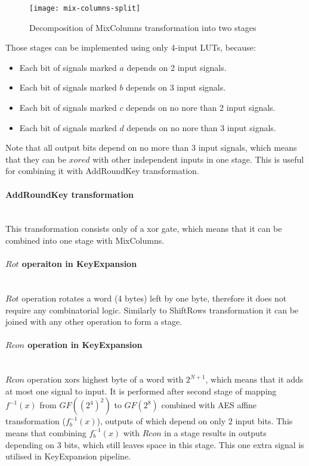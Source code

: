 \begin{figure}[!h]
\centering
\texttt{[image: mix-columns-split]}
\caption{Decomposition of MixColumns transformation into two stages}
\label{fig:mix-columns-split}
\end{figure}

Those stages can be implemented using only 4-input LUTs, because:
\begin{itemize}[nolistsep]
\item Each bit of signals marked $a$ depends on 2 input signals.
\item Each bit of signals marked $b$ depends on 3 input signals.
\item Each bit of signals marked $c$ depends on no nore than 2 input signals.
\item Each bit of signals marked $d$ depends on no nore than 3 input signals.
\end{itemize}

Note that all output bits depend on no more than 3 input signals, which means that they can be $xored$ with other independent inputs in one stage. This is useful for combining it with AddRoundKey transformation.


\paragraph{AddRoundKey transformation}\mbox{}\\
This transformation consists only of a xor gate, which means that it can be combined into one stage with MixColumns.


\paragraph{$Rot$ operaiton in KeyExpansion}\mbox{}\\
$Rot$ operation rotates a word (4 bytes) left by one byte, therefore it does not require any combinatorial logic. Similarly to ShiftRows transformation it can be joined with any other operation to form a stage.

\paragraph{$Rcon$ operation in KeyExpansion}\mbox{}\\
$Rcon$ operation xors highest byte of a word with $2^{N + 1}$, which means that it adds at most one signal to input. It is performed after second stage of mapping $f^{-1}(x)$ from $GF((2^4)^2)$ to $GF(2^8)$ combined with AES affine transformation ($f_b^{-1}(x)$), outputs of which depend on only 2 input bits. This means that combining $f_b^{-1}(x)$ with $Rcon$ in a stage results in outputs depending on 3 bits, which still leaves space in this stage. This one extra signal is utilised in KeyExpansion pipeline.

